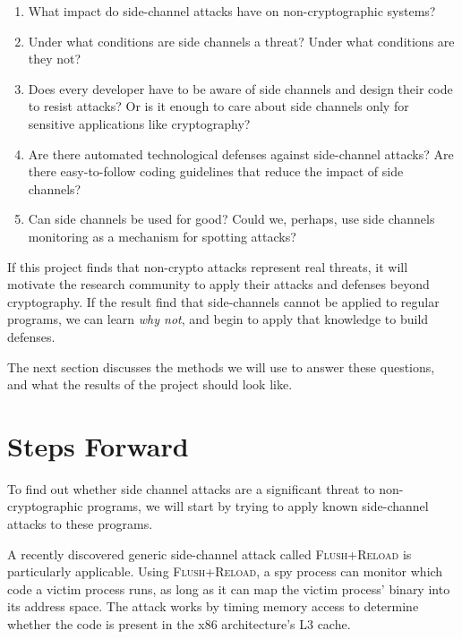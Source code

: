 \documentclass{acm_proc_article-sp}
\begin{document}
\begin{enumerate}
\item What impact do side-channel attacks have on non-cryptographic systems?

\item Under what conditions are side channels a threat? Under what conditions
      are they not?

\item Does every developer have to be aware of side channels and design their
      code to resist attacks? Or is it enough to care about side channels only
      for sensitive applications like cryptography?

\item Are there automated technological defenses against side-channel attacks?
      Are there easy-to-follow coding guidelines that reduce the impact of side
      channels?

\item Can side channels be used for good? Could we, perhaps, use side channels
      monitoring as a mechanism for spotting attacks?
\end{enumerate}

If this project finds that non-crypto attacks represent real threats, it will
motivate the research community to apply their attacks and defenses beyond
cryptography. If the result find that side-channels cannot be applied to regular
programs, we can learn \emph{why not}, and begin to apply that knowledge to
build defenses.

The next section discusses the methods we will use to answer these questions,
and what the results of the project should look like.

\section{Steps Forward}

% 
% 

To find out whether side channel attacks are a significant threat to
non-cryptographic programs, we will start by trying to apply known side-channel
attacks to these programs.

A recently discovered generic side-channel attack called \textsc{Flush+Reload}
\cite{yarom2013flush} is particularly applicable. Using \textsc{Flush+Reload},
a spy process can monitor which code a victim process runs, as long as it can
map the victim process' binary into its address space. The attack works by
timing memory access to determine whether the code is present in the x86
architecture's L3 cache.
\end{document}
